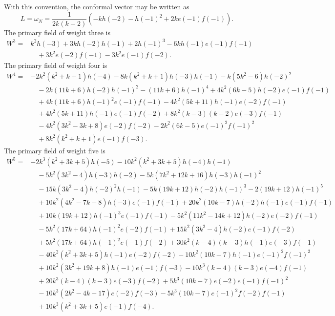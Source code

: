 \documentclass[11 pt]{amsart}
\theoremstyle{definition}
\theoremstyle{plain}
\begin{document}
With this convention, the conformal vector may be written as
\[
L=\omega_N
=\frac{1}{2k(k+2)}\left(
-kh(-2)-h(-1)^2+2k e(-1)f(-1)
\right).
\]
The primary field of weight three is
\[
\begin{aligned}
W^3={}& k^2 h(-3)+3k h(-2)h(-1)+2h(-1)^3
  -6k h(-1)e(-1)f(-1) \\
&\quad +3k^2 e(-2)f(-1)-3k^2 e(-1)f(-2).
\end{aligned}
\]
The primary field of weight four is
\[
\begin{aligned}
W^4={}& -2k^2(k^2+k+1)h(-4)
-8k(k^2+k+1)h(-3)h(-1)
-k(5k^2-6)h(-2)^2 \\
&\quad -2k(11k+6)h(-2)h(-1)^2
-(11k+6)h(-1)^4
+4k^2(6k-5)h(-2)e(-1)f(-1) \\
&\quad +4k(11k+6)h(-1)^2e(-1)f(-1)
-4k^2(5k+11)h(-1)e(-2)f(-1) \\
&\quad +4k^2(5k+11)h(-1)e(-1)f(-2)
+8k^2(k-3)(k-2)e(-3)f(-1) \\
&\quad -4k^2(3k^2-3k+8)e(-2)f(-2)
-2k^2(6k-5)e(-1)^2f(-1)^2 \\
&\quad +8k^2(k^2+k+1)e(-1)f(-3).
\end{aligned}
\]
The primary field of weight five is
\[
\begin{aligned}
W^5={}& -2k^3(k^2+3k+5)h(-5)
-10k^2(k^2+3k+5)h(-4)h(-1) \\
&\quad -5k^2(3k^2-4)h(-3)h(-2)
-5k(7k^2+12k+16)h(-3)h(-1)^2 \\
&\quad -15k(3k^2-4)h(-2)^2h(-1)
-5k(19k+12)h(-2)h(-1)^3
-2(19k+12)h(-1)^5 \\
&\quad +10k^2(4k^2-7k+8)h(-3)e(-1)f(-1)
+20k^2(10k-7)h(-2)h(-1)e(-1)f(-1) \\
&\quad +10k(19k+12)h(-1)^3e(-1)f(-1)
-5k^2(11k^2-14k+12)h(-2)e(-2)f(-1) \\
&\quad -5k^2(17k+64)h(-1)^2e(-2)f(-1)
+15k^2(3k^2-4)h(-2)e(-1)f(-2) \\
&\quad +5k^2(17k+64)h(-1)^2e(-1)f(-2)
+30k^2(k-4)(k-3)h(-1)e(-3)f(-1) \\
&\quad -40k^2(k^2+3k+5)h(-1)e(-2)f(-2)
-10k^2(10k-7)h(-1)e(-1)^2f(-1)^2 \\
&\quad +10k^2(3k^2+19k+8)h(-1)e(-1)f(-3)
-10k^3(k-4)(k-3)e(-4)f(-1) \\
&\quad +20k^3(k-4)(k-3)e(-3)f(-2)
+5k^3(10k-7)e(-2)e(-1)f(-1)^2 \\
&\quad -10k^3(2k^2-4k+17)e(-2)f(-3)
-5k^3(10k-7)e(-1)^2f(-2)f(-1) \\
&\quad +10k^3(k^2+3k+5)e(-1)f(-4).
\end{aligned}
\]
\end{document}
